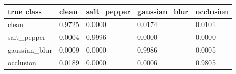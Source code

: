 \begin{tabular}{lllll}
\hline
true class & clean & salt\_pepper & gaussian\_blur & occlusion \\
\hline
clean & 0.9725 & 0.0000 & 0.0174 & 0.0101 \\
salt\_pepper & 0.0004 & 0.9996 & 0.0000 & 0.0000 \\
gaussian\_blur & 0.0009 & 0.0000 & 0.9986 & 0.0005 \\
occlusion & 0.0189 & 0.0000 & 0.0006 & 0.9805 \\
\hline
\end{tabular}
